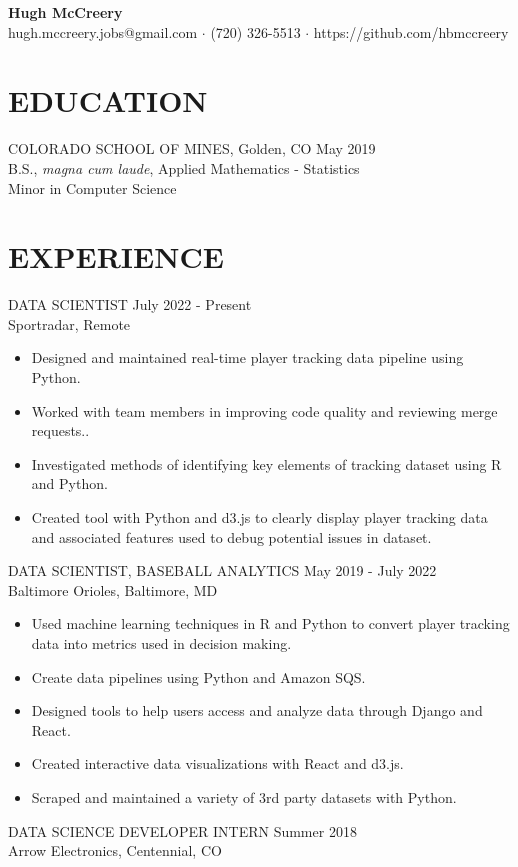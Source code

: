 \documentclass[11pt]{res} %
\begin{document}
 
	\begin{center}
 		\textbf{\LARGE Hugh McCreery} \\
 		hugh.mccreery.jobs@gmail.com $\cdot$ (720) 326-5513 $\cdot$ https://github.com/hbmccreery
	\end{center}
\vspace{-0.6in}
\begin{resume}
\hrulefill
\vspace{-0.2in}                                  
\section{EDUCATION} 
 \noindent COLORADO SCHOOL OF MINES, Golden, CO \hfill May 2019 \\
B.S., \textit{magna cum laude}, Applied Mathematics - Statistics\\
Minor in Computer Science \\
\vspace{-0.1in}
\hrulefill
\vspace{-0.1in}  
\section{EXPERIENCE} 
DATA SCIENTIST \hfill July 2022 - Present	\\
Sportradar, Remote

\begin{itemize}
	\item Designed and maintained real-time player tracking data pipeline using Python.
	\item Worked with team members in improving code quality and reviewing merge requests..
	\item Investigated methods of identifying key elements of tracking dataset using R and Python.
	\item Created tool with Python and d3.js to clearly display player tracking data and associated features used to debug potential issues in dataset.  
\end{itemize}
\vspace{-0.15in} 
DATA SCIENTIST, BASEBALL ANALYTICS \hfill May 2019  - July 2022	\\
Baltimore Orioles, Baltimore, MD

\begin{itemize}
	\item Used machine learning techniques in R and Python to convert player tracking data into metrics used in decision making.
	\item Create data pipelines using Python and Amazon SQS.
	\item Designed tools to help users access and analyze data through Django and React.
	\item Created interactive data visualizations with React and d3.js.
	\item Scraped and maintained a variety of 3rd party datasets with Python.
\end{itemize}
\vspace{-0.15in}  
DATA SCIENCE DEVELOPER INTERN \hfill Summer 2018 \\
Arrow Electronics, Centennial, CO


\end{resume}
\end{document}
